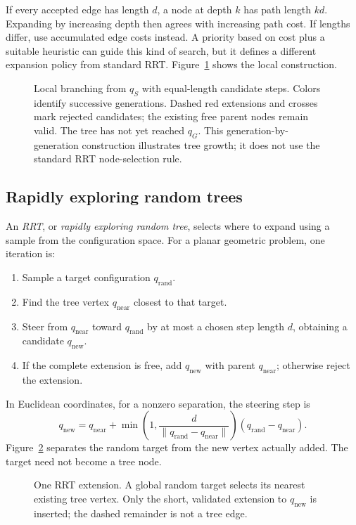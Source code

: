 If every accepted edge has length $d$, a node at depth $k$ has path
length $kd$. Expanding by increasing depth then agrees with increasing
path cost. If lengths differ, use accumulated edge costs instead. A
priority based on cost plus a suitable heuristic can guide this kind of
search, but it defines a different expansion policy from standard RRT.
Figure~\ref{fig:l13-local-tree} shows the local construction.

\begin{figure}[htbp]
\centering
\caption{Local branching from $q_S$ with equal-length candidate steps.
Colors identify successive generations. Dashed red extensions and crosses
mark rejected candidates; the existing free parent nodes remain valid.
The tree has not yet reached $q_G$. This generation-by-generation
construction illustrates tree growth; it does not use the standard RRT
node-selection rule.}
\label{fig:l13-local-tree}
\end{figure}

\subsection{Rapidly exploring random trees}
An \emph{RRT}, or \emph{rapidly exploring random tree}, selects where to
expand using a sample from the configuration space. For a planar geometric
problem, one iteration is:
\begin{enumerate}
\item Sample a target configuration $q_{\mathrm{rand}}$.
\item Find the tree vertex $q_{\mathrm{near}}$ closest to that target.
\item Steer from $q_{\mathrm{near}}$ toward $q_{\mathrm{rand}}$ by at most
a chosen step length $d$, obtaining a candidate $q_{\mathrm{new}}$.
\item If the complete extension is free, add $q_{\mathrm{new}}$ with
parent $q_{\mathrm{near}}$; otherwise reject the extension.
\end{enumerate}
In Euclidean coordinates, for a nonzero separation, the steering step is
\[
 q_{\mathrm{new}}=q_{\mathrm{near}}+
 \min\!\left(1,\frac{d}{\|q_{\mathrm{rand}}-q_{\mathrm{near}}\|}\right)
 (q_{\mathrm{rand}}-q_{\mathrm{near}}).
\]
Figure~\ref{fig:l13-rrt-step} separates the random target from the new
vertex actually added. The target need not become a tree node.

\begin{figure}[htbp]
\centering
\caption{One RRT extension. A global random target selects its nearest
existing tree vertex. Only the short, validated extension to
$q_{\mathrm{new}}$ is inserted; the dashed remainder is not a tree edge.}
\label{fig:l13-rrt-step}
\end{figure}

